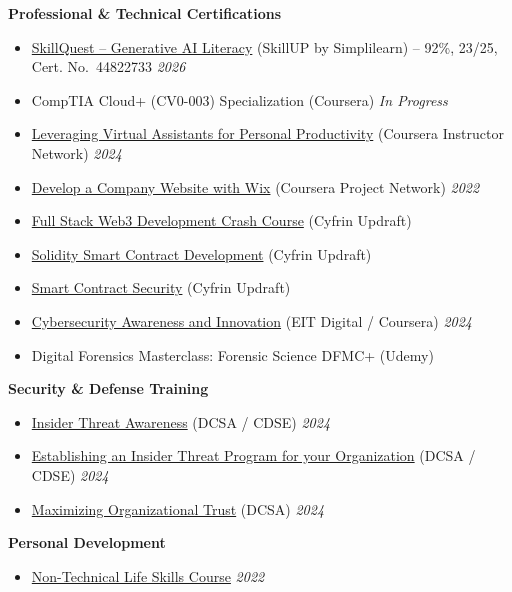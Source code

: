 \documentclass[10pt,a4paper]{article}
\begin{document}
\vspace{0.3em}
\textbf{Professional \& Technical Certifications}
\begin{itemize}[leftmargin=1.5em]
  \item \href{certificate.pdf}{SkillQuest -- Generative AI Literacy} (SkillUP by Simplilearn) -- 92\%, 23/25, Cert. No.\ 44822733 \hfill \textit{2026}
  \item CompTIA Cloud+ (CV0-003) Specialization (Coursera) \hfill \textit{In Progress}
  \item \href{Virtual-Assistants-Cert.pdf}{Leveraging Virtual Assistants for Personal Productivity} (Coursera Instructor Network) \hfill \textit{2024}
  \item \href{Wix-Cert.pdf}{Develop a Company Website with Wix} (Coursera Project Network) \hfill \textit{2022}
  \item \href{https://drive.google.com/file/d/1c48EGdqSb5MEZc-V16A7E3OrAWnvODHN/view?usp=drive_web}{Full Stack Web3 Development Crash Course} (Cyfrin Updraft)
  \item \href{https://drive.google.com/file/d/1c48EGdqSb5MEZc-V16A7E3OrAWnvODHN/view?usp=drive_web}{Solidity Smart Contract Development} (Cyfrin Updraft)
  \item \href{https://drive.google.com/file/d/1c48EGdqSb5MEZc-V16A7E3OrAWnvODHN/view?usp=drive_web}{Smart Contract Security} (Cyfrin Updraft)
  \item \href{Cybersecurity-Awareness-and-Innovation.pdf}{Cybersecurity Awareness and Innovation} (EIT Digital / Coursera) \hfill \textit{2024}
  \item Digital Forensics Masterclass: Forensic Science DFMC+ (Udemy)
\end{itemize}

\vspace{0.3em}
\textbf{Security \& Defense Training}
\begin{itemize}[leftmargin=1.5em]
  \item \href{Insider-Threat-Awareness.pdf}{Insider Threat Awareness} (DCSA / CDSE) \hfill \textit{2024}
  \item \href{Establishing-Insider-Threat-Program.pdf}{Establishing an Insider Threat Program for your Organization} (DCSA / CDSE) \hfill \textit{2024}
  \item \href{Maximizing-Organizational-Trust.pdf}{Maximizing Organizational Trust} (DCSA) \hfill \textit{2024}
\end{itemize}

\vspace{0.3em}
\textbf{Personal Development}
\begin{itemize}[leftmargin=1.5em]
  \item \href{Non-Technical-Life-Skills.pdf}{Non-Technical Life Skills Course} \hfill \textit{2022}
\end{itemize}
\end{document}
